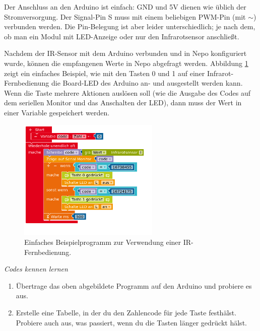 Der Anschluss an den Arduino ist einfach: GND und 5V dienen wie üblich der Stromversorgung. Der Signal-Pin S muss mit einem beliebigen PWM-Pin (mit $\sim$) verbunden werden. Die Pin-Belegung ist aber leider unterschiedlich; je nach dem, ob man ein Modul mit LED-Anzeige oder nur den Infrarotsensor anschließt.

Nachdem der IR-Sensor mit dem Arduino verbunden und in Nepo konfiguriert wurde, können die empfangenen Werte in Nepo abgefragt werden. Abbildung \ref{abb:ir-fernbedienung-auslesen} zeigt ein einfaches Beispiel, wie mit den Tasten 0 und 1 auf einer Infrarot-Fernbedienung die Board-LED des Arduino an- und ausgestellt werden kann. Wenn die Taste mehrere Aktionen auslösen soll (wie die Ausgabe des Codes auf dem seriellen Monitor und das Anschalten der LED), dann muss der Wert in einer Variable gespeichert werden.

\begin{figure}[H]
	\centering
	\includegraphics[width=0.6\textwidth]{./pics/ir-fernbedienung-auslesen.png}
	\caption{Einfaches Beispielprogramm zur Verwendung einer IR-Fernbedienung.}
	\label{abb:ir-fernbedienung-auslesen}
\end{figure}

\begin{aufgabe} \emph{Codes kennen lernen}
	\begin{enumerate}[label=\alph*),itemsep=0mm,parsep=0mm]
		\item Übertrage das oben abgebildete Programm auf den Arduino und probiere es aus.
		\item Erstelle eine Tabelle, in der du den Zahlencode für jede Taste festhälst. Probiere auch aus, was passiert, wenn du die Tasten länger gedrückt hälst.
	\end{enumerate}
\end{aufgabe}

